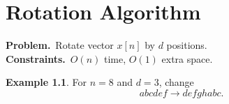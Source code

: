 \documentclass[12pt,openany]{book}
\theoremstyle{definition}
\newtheorem{example}{Example}[chapter]
\begin{document}
	\tableofcontents
	
	\mainmatter
	 
	\chapter{Rotation Algorithm}
	\begin{tcolorbox}[colback=white,colframe=lemcolor,arc=5pt,title={\color{white}\bf Rotation}]
		\textbf{Problem.}\ Rotate vector \(x[n]\) by $d$ positions.\\
		\textbf{Constraints.}\ $O(n)$ time, $O(1)$ extra space.
	\end{tcolorbox}
	\begin{example}
		For $n=8$ and $d=3$, change \[
		abcdef\to defghabc.
		\]
	\end{example}
\end{document}
